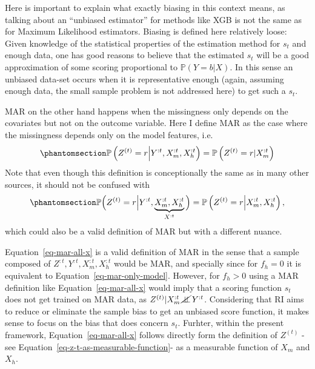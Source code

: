 \documentclass[
  12pt,
]{article}
\begin{document}
Here is important to explain what exactly biasing in this context means,
as talking about an ``unbiased estimator'' for methods like XGB is not
the same as for Maximum Likelihood estimators. Biasing is defined here
relatively loose: Given knowledge of the statistical properties of the
estimation method for \(s_t\) and enough data, one has good reasons to
believe that the estimated \(s_t\) will be a good approximation of some
scoring proportional to \(\mathbb{P}(Y = b | X)\). In this sense an
unbiased data-set occurs when it is representative enough (again,
assuming enough data, the small sample problem is not addressed here) to
get such a \(s_t\).

MAR on the other hand happens when the missingness only depends on the
covariates but not on the outcome variable. Here I define MAR as the
case where the missingness depends only on the model features, i.e.
\begin{equation}\protect\phantomsection\label{eq-mar-only-model}{
\mathbb{P}\left(Z^{(t)} = r \middle | Y^{:t}, X_m^{:t}, X_h^{:t} \right) =
\mathbb{P}\left(Z^{(t)} = r | X_m^{:t} \right)
}\end{equation} Note that even though this definition is conceptionally
the same as in many other sources, it should not be confused with
\begin{equation}\protect\phantomsection\label{eq-mar-all-x}{
\mathbb{P}\Big(
    Z^{(t)} = r \Big | Y^{:t},
    \underbrace{X_m^{:t}, X_h^{:t}}_{X^{:t}}
\Big)
=
\mathbb{P}\left(Z^{(t)} = r \middle | X_m^{:t}, X_h^{:t}\right),
}\end{equation} which could also be a valid definition of MAR but with a
different nuance.

Equation~\ref{eq-mar-all-x} is a valid definition of MAR in the sense
that a sample composed of \(Z^{:t}, Y^{:t}, X_m^{:t}, X_h^{:t}\) would
be MAR, and specially since for \(f_h=0\) it is equivalent to
Equation~\ref{eq-mar-only-model}. However, for \(f_h>0\) using a MAR
definition like Equation~\ref{eq-mar-all-x} would imply that a scoring
function \(s_t\) does not get trained on MAR data, as
\(Z^{(t)} | X_m^{:t} \, \cancel{\perp\!\!\!\perp} \, Y^{:t}\).
Considering that RI aims to reduce or eliminate the sample bias to get
an unbiased score function, it makes sense to focus on the bias that
does concern \(s_t\). Furhter, within the present framework,
Equation~\ref{eq-mar-all-x} follows directly form the definition of
\(Z^{(t)}\) -see Equation~\ref{eq-z-t-as-measurable-function}- as a
measurable function of \(X_m\) and \(X_h\).
\end{document}
